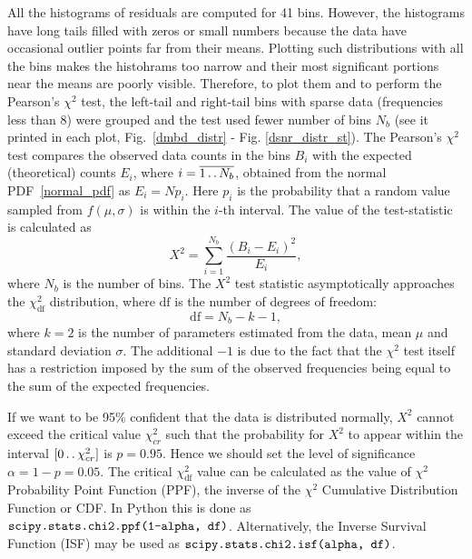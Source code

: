 \documentclass[letterpaper,twoside,12pt]{article}
\newcommand{\twodots}{\mathinner {\ldotp \ldotp}}
\begin{document}
All the histograms of residuals are computed for 41 bins. However, the histograms have long tails filled with zeros or small numbers because the data have occasional outlier points far from their means. Plotting such distributions with all the bins makes the histohrams too narrow and their most significant portions near the means are poorly visible. Therefore, to plot them and to perform the Pearson's $\chi^2$ test, the left-tail and right-tail bins with sparse data (frequencies less than 8) were grouped and the test used fewer number of bins $N_b$ (see it printed in each plot, Fig.~\ref{dmbd_distr} - Fig. \ref{dsnr_distr_st}). The Pearson's $\chi^2$ test compares the observed data counts in the bins $B_i$ with the expected (theoretical) counts $E_i$, where $i=\overline{1 \twodots N_b}$, obtained from the normal PDF~\eqref{normal_pdf} as $E_i = Np_i$. Here $p_i$ is the probability that a random value sampled from $f(\mu,\sigma)$ is within the $i$-th interval. The value of the test-statistic is calculated as
\begin{equation}
  \label{x2_calc}
  X^2 = \sum_{i=1}^{N_b} \frac{(B_i - E_i)^2}{E_i},
\end{equation}
where $N_b$ is the number of bins.
The $X^2$ test statistic asymptotically approaches the $\chi^2_\mathrm{df}$ distribution, where $\mathrm{df}$ is the number of degrees of freedom:
\begin{equation}
  \label{df}
  \mathrm{df} = N_b - k - 1,
\end{equation}
where $k=2$ is the number of parameters estimated from the data, mean $\mu$ and standard deviation $\sigma$. The additional $-1$ is due to the fact that the $\chi^2$ test itself has a restriction imposed by the sum of the observed frequencies being equal to the sum of the expected frequencies.

If we want to be 95\% confident that the data is distributed normally, $X^2$ cannot exceed the critical value $\chi^2_{cr}$ such that the probability for $X^2$ to appear within the interval $[0 \twodots \chi^2_{cr}]$ is $p=0.95$. Hence we should set the level of significance $\alpha = 1 - p = 0.05$.  The critical $\chi^2_\mathrm{df}$ value can be calculated as the value of $\chi^2$ Probability Point Function (PPF), the inverse of the $\chi^2$ Cumulative Distribution Function or CDF. In Python this is done as $\verb@scipy.stats.chi2.ppf(1-alpha, df)@$. Alternatively, the Inverse Survival Function (ISF) may be used as $\verb@scipy.stats.chi2.isf(alpha, df)@$.
\end{document}
